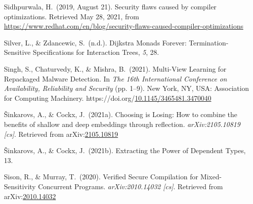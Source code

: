 \documentclass[12pt,twoside]{article}
\begin{document}
{\begin{thebibliography}{1079}
\mdbibitemlabel{}Sidhpurwala, H.~(2019, August 21). Security flaws caused by compiler optimizations. Retrieved May 28, 2021, from \href{https://www.redhat.com/en/blog/security-flaws-caused-compiler-optimizations}{{\ttfamily https://\hspace{0pt}www.\hspace{0pt}redhat.\hspace{0pt}com/\hspace{0pt}en/\hspace{0pt}blog/\hspace{0pt}security-\hspace{0pt}flaws-\hspace{0pt}caused-\hspace{0pt}compiler-\hspace{0pt}optimizations}}%

\mdbibitemlabel{}Silver, L., \& Zdancewic, S.~(n.d.). Dijkstra Monads Forever: Termination-Sensitive Specifications for Interaction Trees, \emph{5}, 28.%

\mdbibitemlabel{}Singh, S., Chaturvedy, K., \& Mishra, B.~(2021). Multi-View Learning for Repackaged Malware Detection. In \emph{The 16th International Conference on Availability, Reliability and Security} (pp. 1–9). New York, NY, USA: Association for Computing Machinery. https://doi.org/\href{https://dx.doi.org/10.1145/3465481.3470040}{10.1145/3465481.3470040}%

\mdbibitemlabel{}Šinkarovs, A., \& Cockx, J.~(2021a). Choosing is Losing: How to combine the benefits of shallow and deep embeddings through reflection. \emph{arXiv:2105.10819 {}[cs]}. Retrieved from arXiv:\href{http://arxiv.org/abs/2105.10819}{2105.10819}%

\mdbibitemlabel{}Šinkarovs, A., \& Cockx, J.~(2021b). Extracting the Power of Dependent Types, 13.%

\mdbibitemlabel{}Sison, R., \& Murray, T.~(2020). Verified Secure Compilation for Mixed-Sensitivity Concurrent Programs. \emph{arXiv:2010.14032 {}[cs]}. Retrieved from arXiv:\href{http://arxiv.org/abs/2010.14032}{2010.14032}%


\end{thebibliography}}
\end{document}
